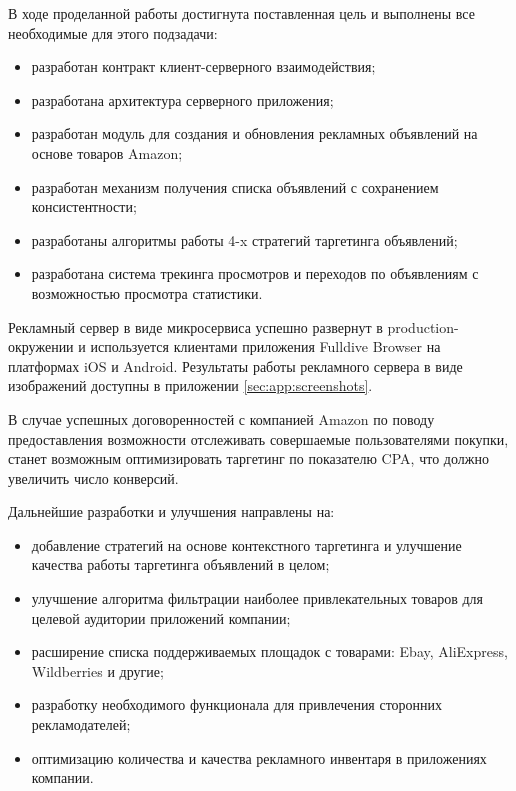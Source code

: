 \documentclass[specification,annotation,times]{itmo-student-thesis}
\begin{document}
\startconclusionpage

В ходе проделанной работы достигнута поставленная цель и выполнены все необходимые для этого подзадачи:
\begin{itemize}
\item разработан контракт клиент-серверного взаимодействия;
\item разработана архитектура серверного приложения;
\item разработан модуль для создания и обновления рекламных объявлений на основе товаров Amazon;
\item разработан механизм получения списка объявлений с сохранением консистентности;
\item разработаны алгоритмы работы 4-x стратегий таргетинга объявлений;
\item разработана система трекинга просмотров и переходов по объявлениям с возможностью просмотра статистики.
\end{itemize}

Рекламный сервер в виде микросервиса успешно развернут в production-окружении и используется клиентами приложения Fulldive Browser на платформах iOS и Android. Результаты работы рекламного сервера в виде изображений доступны в приложении \ref{sec:app:screenshots}.

В случае успешных договоренностей с компанией Amazon по поводу предоставления возможности отслеживать совершаемые пользователями покупки, станет возможным оптимизировать таргетинг по показателю CPA, что должно увеличить число конверсий.

Дальнейшие разработки и улучшения направлены на:
\begin{itemize}
\item добавление стратегий на основе контекстного таргетинга и улучшение качества работы таргетинга объявлений в целом;
\item улучшение алгоритма фильтрации наиболее привлекательных товаров для целевой аудитории приложений компании;
\item расширение списка поддерживаемых площадок с товарами: Ebay, AliExpress, Wildberries и другие;
\item разработку необходимого функционала для привлечения сторонних рекламодателей;
\item оптимизацию количества и качества рекламного инвентаря в приложениях компании.
\end{itemize}

\printmainbibliography
\end{document}
